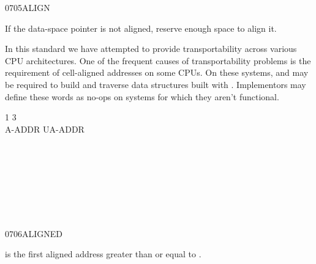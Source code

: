 \begin{worddef}{0705}{ALIGN}
\item \stack{}{}

	If the data-space pointer is not aligned, reserve enough space
	to align it.


	\begin{rationale} %
		In this standard we have attempted to provide transportability
		across various CPU architectures. One of the frequent causes
		of transportability problems is the requirement of cell-aligned
		addresses on some CPUs. On these systems,  and
		 may be required to build and traverse data
		structures built with . Implementors may define these
		words as no-ops on systems for which they aren't functional.
	\end{rationale}

	\begin{testing} %
		\ttfamily
		  1      3   \\
		 A-ADDR   UA-ADDR \\
		 \\
		 \\
		 \\
		 \\
		 \\
		 \\
		 \\
	\end{testing}
\end{worddef}


\vspace*{-6ex}
\begin{worddef}{0706}{ALIGNED}
\item {}

	 is the first aligned address greater than or equal
	to .

\end{worddef}

